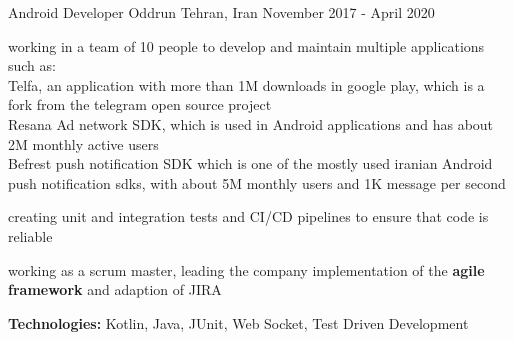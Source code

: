 \begin{cventries}
    \cventry
    {Android Developer} %
    {Oddrun} %
    {Tehran, Iran} %
    {November 2017 - April 2020} %
    { 
      \begin{cvitems} %
        \item working in a team of 10 people to develop and maintain multiple applications such as: 
        \\ Telfa, an application with more than 1M downloads in google play, which is a fork from the telegram open source project
        \\ Resana Ad network SDK, which is used in Android applications and has about 2M monthly active users
        \\ Befrest push notification SDK which is one of the mostly used iranian Android push notification sdks, with about 5M monthly users and 1K message per second
        \item creating unit and integration tests and CI/CD pipelines to ensure that code is reliable
        \item working as a scrum master, leading the company implementation of the \textbf{agile framework} and adaption of JIRA
        \item \textbf{Technologies:} Kotlin, Java, JUnit, Web Socket, Test Driven Development
      \end{cvitems}
    }

\end{cventries}
